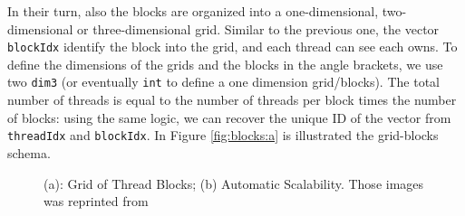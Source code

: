In their turn, also the blocks are organized into a one-dimensional, two-dimensional or three-dimensional grid. Similar to the previous one, the vector \verb|blockIdx| identify the block into the grid, and each thread can see each owns. To define the dimensions of the grids and the blocks in the angle brackets, we use two \verb|dim3| (or eventually \verb|int| to define a one dimension grid/blocks). The total number of threads is equal to the number of threads per block times the number of blocks: using the same logic, we can recover the unique ID of the vector from \verb|threadIdx| and \verb|blockIdx|. In Figure \ref{fig:blocks:a} is illustrated the grid-blocks schema.
\begin{figure}
	\hspace*{-4em}
	\hspace{1em}%
	\caption{(a): Grid of Thread Blocks; (b) Automatic Scalability. Those images was reprinted from \cite{cuda_manual} }
\end{figure}\\
